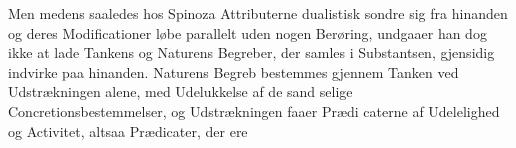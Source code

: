 \documentclass[12pt,a4paper]{book}
\begin{document}
Men medens saaledes hos Spinoza Attributerne dualistisk
sondre sig fra hinanden og deres Modificationer løbe parallelt
uden nogen Berøring, undgaaer han dog ikke at lade Tankens
og Naturens Begreber, der samles i Substantsen, gjensidig
indvirke paa hinanden. Naturens Begreb bestemmes gjennem
Tanken ved Udstrækningen alene, med Udelukkelse af de sand\-%
selige Concretionsbestemmelser, og Udstrækningen faaer Prædi\-%
caterne af Udelelighed og Activitet, altsaa Prædicater, der ere
\end{document}
